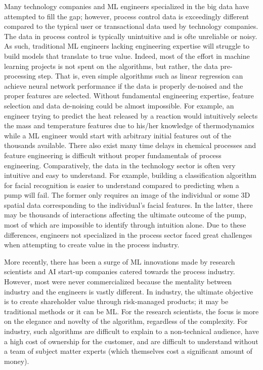 Many technology companies and ML engineers specialized in the big data have attempted to fill the gap; however, process control data is exceedingly different compared to the typical user or transactional data used by technology companies. The data in process control is typically unintuitive and is ofte unreliable or noisy. As such, traditional ML engineers lacking engineering expertise will struggle to build models that translate to true value. Indeed, most of the effort in machine learning projects is not spent on the algorithms, but rather, the data pre-processing step.  That is, even simple algorithms such as linear regression can achieve neural network performance if the data is properly de-noised and the proper features are selected. Without fundamental engineering expertise, feature selection and data de-noising could be almost impossible. For example, an engineer trying to predict the heat released by a reaction would intuitively selects the mass and temperature features due to his/her knowledge of thermodynamics while a ML engineer would start with arbitrary initial features out of the thousands available. There also exist many time delays in chemical processes and feature engineering is difficult without proper fundamentals of process engineering. Comparatively, the data in the technology sector is often very intuitive and easy to understand.  For example, building a classification algorithm for facial recognition is easier to understand compared to predicting when a pump will fail.  The former only requires an image of the individual or some 3D spatial data corresponding to the individual's facial features. In the latter, there may be thousands of interactions affecting the ultimate outcome of the pump, most of which are impossible to identify through intuition alone. Due to these differences, engineers not specialized in the process sector faced great challenges when attempting to create value in the process industry.

More recently, there has been a surge of ML innovations made by research scientists and AI start-up companies catered towards the process industry.  However, most were never commercialized because the mentality between industry and the engineers is vastly different.  In industry, the ultimate objective is to create shareholder value through risk-managed products; it may be traditional methods or it can be ML.  For the research scientists, the focus is more on the elegance and novelty of the algorithm, regardless of the complexity. For industry, such algorithms are difficult to explain to a non-technical audience, have a high cost of ownership for the customer, and are difficult to understand without a team of subject matter experts (which themselves cost a significant amount of money).

